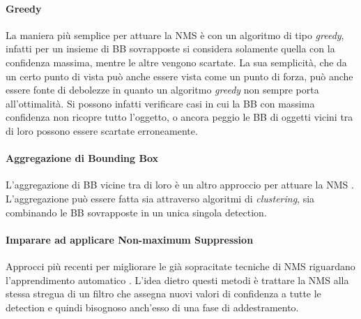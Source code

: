 \paragraph{Greedy}
La maniera più semplice per attuare la \ac{NMS} è con un algoritmo di tipo \textit{greedy}, infatti per un insieme di \ac{BB} sovrapposte si considera solamente quella con la confidenza massima, mentre le altre vengono scartate. La sua semplicità, che da un certo punto di vista può anche essere vista come un punto di forza, può anche essere fonte di debolezze in quanto un algoritmo \textit{greedy} non sempre porta all'ottimalità. Si possono infatti verificare casi in cui la \ac{BB} con massima confidenza non ricopre tutto l'oggetto, o ancora peggio le \ac{BB} di oggetti vicini tra di loro possono essere scartate erroneamente.


\paragraph{Aggregazione di Bounding Box}
L'aggregazione di \ac{BB} vicine tra di loro è un altro approccio per attuare la \ac{NMS} \cite{viola2001rapid, sermanet2013overfeat, rothe2014non, mrowca2015spatial}. L'aggregazione può essere fatta sia attraverso algoritmi di \textit{clustering}, sia combinando le \ac{BB} sovrapposte in un unica singola detection. 


\paragraph{Imparare ad applicare Non-maximum Suppression}
Approcci più recenti per migliorare le già sopracitate tecniche di \ac{NMS} riguardano l'apprendimento automatico \cite{wan2015end, desai2011discriminative, hosang2017learning, henderson2016end}. L'idea dietro questi metodi è trattare la \ac{NMS} alla stessa stregua di un filtro che assegna nuovi valori di confidenza a tutte le detection e quindi bisognoso anch'esso di una fase di addestramento. 

